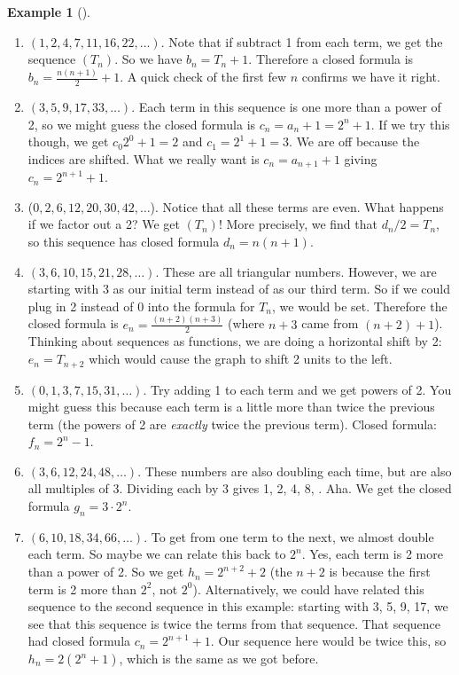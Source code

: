 \documentclass[10pt,]{book}
\theoremstyle{plain}
\theoremstyle{definition}
\theoremstyle{definition}
\newtheorem{example}[theorem]{Example}
\theoremstyle{definition}
\theoremstyle{definition}
\numberwithin{equation}{chapter}
\begin{document}
\begin{example}[]
\begin{enumerate}
\item\hypertarget{li-46}{}\hypertarget{p-74}{}%
\((1, 2, 4, 7, 11, 16, 22, \ldots)\). Note that if subtract 1 from each term, we get the sequence \((T_n)\). So we have \(b_n = T_n + 1\). Therefore a closed formula is \(b_n = \frac{n(n+1)}{2} + 1\). A quick check of the first few \(n\) confirms we have it right.%
\item\hypertarget{li-47}{}\hypertarget{p-75}{}%
\((3, 5, 9, 17, 33, \ldots )\). Each term in this sequence is one more than a power of 2, so we might guess the closed formula is \(c_n = a_n+1 = 2^n + 1\). If we try this though, we get \(c_0 2^0 + 1 = 2\) and \(c_1 = 2^1 + 1 = 3\). We are off because the indices are shifted.  What we really want is \(c_n = a_{n+1}+1\) giving  \(c_n = 2^{n+1} + 1\).%
\item\hypertarget{li-48}{}\hypertarget{p-76}{}%
(\(0, 2, 6, 12, 20, 30, 42,\ldots \)). Notice that all these terms are even. What happens if we factor out a 2? We get \((T_n)\)! More precisely, we find that \(d_n/2 = T_n\), so this sequence has closed formula \(d_n = n(n+1)\).%
\item\hypertarget{li-49}{}\hypertarget{p-77}{}%
\((3, 6, 10, 15, 21, 28, \ldots)\). These are all triangular numbers. However, we are starting with 3 as our initial term instead of as our third term. So if we could plug in 2 instead of 0 into the formula for \(T_n\), we would be set. Therefore the closed formula is \(e_n = \frac{(n+2)(n+3)}{2}\) (where \(n+3\) came from \((n+2)+1\)).  Thinking about sequences as functions, we are doing a horizontal shift by 2: \(e_n = T_{n+2}\) which would cause the graph to shift 2 units to the left.%
\item\hypertarget{li-50}{}\hypertarget{p-78}{}%
\((0, 1, 3, 7, 15, 31, \ldots )\). Try adding 1 to each term and we get powers of 2. You might guess this because each term is a little more than twice the previous term (the powers of 2 are \emph{exactly} twice the previous term). Closed formula: \(f_n = 2^{n} - 1\).%
\item\hypertarget{li-51}{}\hypertarget{p-79}{}%
\((3, 6, 12, 24, 48, \ldots )\). These numbers are also doubling each time, but are also all multiples of 3. Dividing each by 3   gives 1, 2, 4, 8, \textellipsis{}. Aha. We get the closed formula \(g_n = 3\cdot 2^{n}\).%
\item\hypertarget{li-52}{}\hypertarget{p-80}{}%
\((6, 10, 18, 34, 66, \ldots )\). To get from one term to the next, we almost double each term. So maybe we can relate this back to \(2^n\). Yes, each term is 2 more than a power of 2. So we get \(h_n = 2^{n+2} + 2\) (the \(n+2\) is because the first term is 2 more than \(2^2\), not \(2^0\)). Alternatively, we could have related this sequence to the second sequence in this example: starting with 3, 5, 9, 17, \textellipsis{} we see that this sequence is twice the terms from that sequence. That sequence had closed formula \(c_n = 2^{n+1} + 1\). Our sequence here would be twice this, so \(h_n = 2(2^n + 1)\), which is the same as we got before.%

\end{enumerate}
\end{example}
\end{document}

